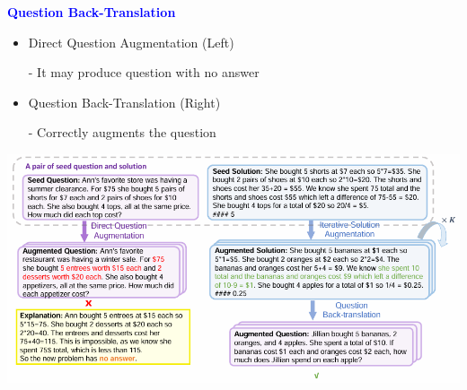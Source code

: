 \documentclass[professionalfont]{beamer}
\begin{document}
\begin{frame}
\begin{center}
    { \textbf{\textcolor{blue}{ {\fontsize{12}{14}\selectfont Question Back-Translation} }} }
\end{center}

{\fontsize{10}{14}\selectfont 
\begin{itemize}
    \item Direct Question Augmentation (Left)
    
    - It may produce question with no answer
\end{itemize}

\begin{itemize}
    \item Question Back-Translation (Right)
    
    - Correctly augments the question
\end{itemize}
}

\begin{center}
    \includegraphics[width=1.0\textwidth]{figure2.png}
\end{center}

\end{frame}
\end{document}
